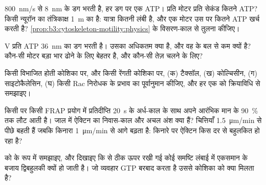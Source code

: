 \begin{exercise}[$\star\star$]\label{exo:b3:cytoskeleton-motility:6}
 \qty{800}{nm/s} से \qty{8}{nm} के डग भरती है, हर डग पर एक ATP।
प्रति मोटर प्रति सेकंड कितने ATP? किसी न्यूरॉन का तंत्रिकाक्ष
\qty{1}{m} का है: यात्रा कितनी लंबी है, और एक मोटर उस पर कितने ATP खर्च
करती है? \cref{prop:b3:cytoskeleton-motility:physics} के विसरण-काल से तुलना कीजिए।
\end{exercise}

\begin{exercise}[$\star\star$]\label{exo:b3:cytoskeleton-motility:7}
 V प्रति ATP \qty{36}{nm} का डग भरती है। उसका अधिकतम 
क्या है, और वह  के बल से कम क्यों है? कौन-सी मोटर बड़ा भार ढोने
के लिए बेहतर है, और कौन-सी तेज़ चलने के लिए?
\end{exercise}

\begin{exercise}[$\star\star$]\label{exo:b3:cytoskeleton-motility:8}
किसी विभाजित होती कोशिका पर, और किसी रेंगती कोशिका पर, (क)
टैक्सॉल, (ख) कोल्चिसीन, (ग) साइटोकैलेसिन, (घ) किसी Rac निरोधक के
प्रभाव का पूर्वानुमान कीजिए, और हर एक को क्रियाविधि से समझाइए।
\end{exercise}

\begin{exercise}[$\star\star$]\label{exo:b3:cytoskeleton-motility:9}
किसी  पर किसी FRAP प्रयोग में प्रतिदीप्ति \qty{20}{s} के
अर्ध-काल के साथ अपने आरंभिक मान के \qty{90}{\%} तक लौट आती है। जाल में
ऐक्टिन का निवास-काल और अचल अंश क्या हैं?
चित्तियाँ \qty{1.5}{\micro m/min} से पीछे बहती हैं जबकि किनारा
\qty{1}{\micro m/min} से आगे बढ़ता है: किनारे पर ऐक्टिन किस दर से
बहुलकित हो रहा है?
\end{exercise}

\begin{exercise}[$\star\star\star$]\label{exo:b3:cytoskeleton-motility:10}
 को  के रूप में समझाइए, और दिखाइए कि  से ठीक ऊपर रखी गई कोई  समष्टि लंबाई में एकसमान के
बजाय द्विबहुलकी क्यों हो जाती है। जो व्यवहार GTP बरबाद करता है उससे
कोशिका को क्या मिलता है?
\end{exercise}

